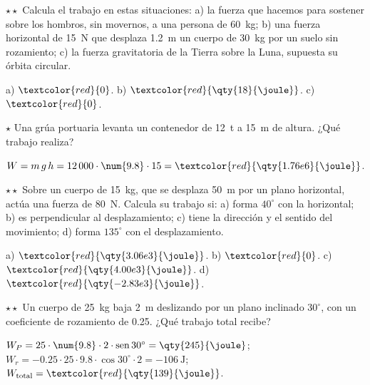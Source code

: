 \begin{exercise}
    \(\star\star\) Calcula el trabajo en estas situaciones: a) la fuerza que hacemos para sostener sobre los hombros, sin movernos, a una
    persona de \qty{60}{\kg}; b) una fuerza horizontal de \qty{15}{\newton} que desplaza \qty{1.2}{\m} un cuerpo de \qty{30}{\kg} por un
    suelo sin rozamiento; c) la fuerza gravitatoria de la Tierra sobre la Luna, supuesta su órbita circular.
    \begin{solu}
        a) \(\textcolor{red}{0}\). b) \(\textcolor{red}{\qty{18}{\joule}}\). c) \(\textcolor{red}{0}\).
    \end{solu}
\end{exercise}

\begin{exercise}
    \(\star\) Una grúa portuaria levanta un contenedor de \qty{12}{t} a \qty{15}{\m} de altura. ¿Qué trabajo realiza?
    \begin{solu}
        \(W = m\,g\,h = 12\,000 \cdot \num{9.8} \cdot 15 = \textcolor{red}{\qty{1.76e6}{\joule}}\).
    \end{solu}
\end{exercise}

\begin{exercise}
    \(\star\star\) Sobre un cuerpo de \qty{15}{\kg}, que se desplaza \qty{50}{\m} por un plano horizontal, actúa una fuerza de
    \qty{80}{\newton}. Calcula su trabajo si: a) forma \(40^\circ\) con la horizontal; b) es perpendicular al desplazamiento; c) tiene la
    dirección y el sentido del movimiento; d) forma \(135^\circ\) con el desplazamiento.
    \begin{solu}
        a) \(\textcolor{red}{\qty{3.06e3}{\joule}}\). b) \(\textcolor{red}{0}\). c) \(\textcolor{red}{\qty{4.00e3}{\joule}}\).
        d) \(\textcolor{red}{\qty{-2.83e3}{\joule}}\).
    \end{solu}
\end{exercise}

\begin{exercise}
    \(\star\star\) Un cuerpo de \qty{25}{\kg} baja \qty{2}{\m} deslizando por un plano inclinado \(30^\circ\), con un coeficiente de
    rozamiento de \num{0.25}. ¿Qué trabajo total recibe?
    \begin{solu}
        \(W_P = 25 \cdot \num{9.8} \cdot 2 \cdot \sen 30^\circ = \qty{245}{\joule}\); \(W_r = -\num{0.25} \cdot 25 \cdot \num{9.8} \cdot \cos 30^\circ
        \cdot 2 = \qty{-106}{\joule}\); \(W_{\text{total}} = \textcolor{red}{\qty{139}{\joule}}\).
    \end{solu}
\end{exercise}

